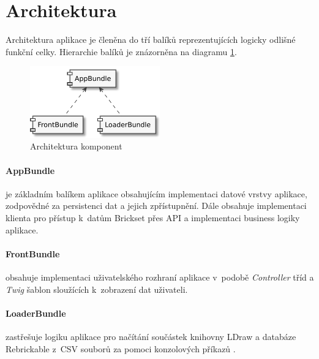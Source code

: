 \section{Architektura}
Architektura aplikace je členěna do tří balíků reprezentujících logicky odlišné funkční celky. Hierarchie balíků je znázorněna na diagramu \ref{diagram-bundles}.

\begin{figure}[htbp]
    \centering
    \includegraphics[width=0.5\textwidth,height=\textheight,keepaspectratio]{pdfs/bundles}
    \caption{Architektura komponent\label{diagram-bundles}}
\end{figure}

\paragraph{AppBundle}  
je základním balíkem aplikace obsahujícím implementaci datové vrstvy aplikace, zodpovědné za persistenci dat a jejich zpřístupnění. Dále obsahuje implementaci klienta pro přístup k~datům Brickset přes API a implementaci business logiky aplikace.

\paragraph{FrontBundle} 
obsahuje implementaci uživatelského rozhraní aplikace v~podobě \textit{Controller} tříd a \textit{Twig} šablon sloužících k~zobrazení dat uživateli.

\paragraph{LoaderBundle} 
zastřešuje logiku aplikace pro načítání součástek knihovny LDraw a databáze Rebrickable z~\gls{CSV} souborů za pomoci konzolových příkazů \autocite{symfony:console}. 

